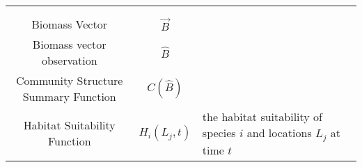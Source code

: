 \begin{longtable}[]{@{}ccl@{}}
\begin{minipage}[t]{0.42\columnwidth}
\strut
\end{minipage}\tabularnewline
\begin{minipage}[t]{0.25\columnwidth}\centering
\strut
\end{minipage} & \begin{minipage}[t]{0.23\columnwidth}\centering
\strut
\end{minipage} & \begin{minipage}[t]{0.42\columnwidth}\raggedright
\strut
\end{minipage}\tabularnewline
\begin{minipage}[t]{0.25\columnwidth}\centering
Biomass Vector\strut
\end{minipage} & \begin{minipage}[t]{0.23\columnwidth}\centering
\(\vec{B}\)\strut
\end{minipage} & \begin{minipage}[t]{0.42\columnwidth}\raggedright
\strut
\end{minipage}\tabularnewline
\begin{minipage}[t]{0.25\columnwidth}\centering
Biomass vector observation\strut
\end{minipage} & \begin{minipage}[t]{0.23\columnwidth}\centering
\(\hat{B}\)\strut
\end{minipage} & \begin{minipage}[t]{0.42\columnwidth}\raggedright
\strut
\end{minipage}\tabularnewline
\begin{minipage}[t]{0.25\columnwidth}\centering
Community Structure Summary Function\strut
\end{minipage} & \begin{minipage}[t]{0.23\columnwidth}\centering
\(C(\hat{B})\)\strut
\end{minipage} & \begin{minipage}[t]{0.42\columnwidth}\raggedright
\strut
\end{minipage}\tabularnewline
\begin{minipage}[t]{0.25\columnwidth}\centering
Habitat Suitability Function\strut
\end{minipage} & \begin{minipage}[t]{0.23\columnwidth}\centering
\(H_i(L_j,t)\)\strut
\end{minipage} & \begin{minipage}[t]{0.42\columnwidth}\raggedright
the habitat suitability of species \(i\) and locations \(L_j\) at time
\(t\)\strut
\end{minipage}\tabularnewline

\end{longtable}
